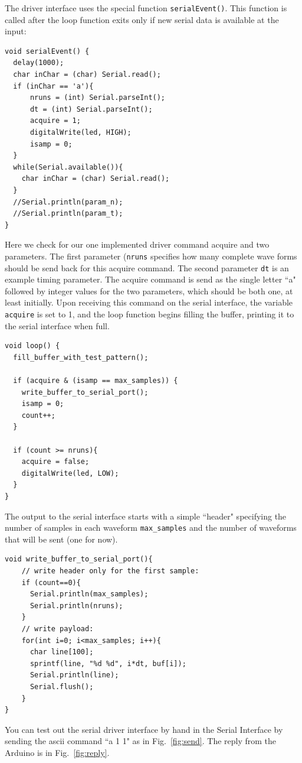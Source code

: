\documentclass[12pt]{article}
\begin{document}
The driver interface uses the special function {\tt serialEvent()}.  This function is called after the loop function exits only if new serial data is available at the input:
\begin{verbatim}
void serialEvent() {
  delay(1000);
  char inChar = (char) Serial.read();
  if (inChar == 'a'){
      nruns = (int) Serial.parseInt();
      dt = (int) Serial.parseInt();        
      acquire = 1;
      digitalWrite(led, HIGH);
      isamp = 0;
  }
  while(Serial.available()){
    char inChar = (char) Serial.read();  
  }
  //Serial.println(param_n);
  //Serial.println(param_t);
}
\end{verbatim}
Here we check for our one implemented driver command acquire and two parameters.  The first parameter ({\tt nruns} specifies how many complete wave forms should be send back for this acquire command.  The second parameter {\tt dt} is an example timing parameter.   The acquire command is send as the single letter ``a" followed by integer values for the two parameters, which should be both one, at least initially.
Upon receiving this command on the serial interface, the variable {\tt acquire} is set to 1, and the loop function begins filling the buffer, printing it to the serial interface when full.
\begin{verbatim}
void loop() {    
  fill_buffer_with_test_pattern();
  
  if (acquire & (isamp == max_samples)) {
    write_buffer_to_serial_port();
    isamp = 0;    
    count++;
  }

  if (count >= nruns){
    acquire = false;
    digitalWrite(led, LOW);
  }
}
\end{verbatim}
The output to the serial interface starts with a simple ``header" specifying the number of samples in each waveform {\tt max\_samples} and the number of waveforms that will be sent (one for now). 
\begin{verbatim}
void write_buffer_to_serial_port(){
    // write header only for the first sample:
    if (count==0){
      Serial.println(max_samples);
      Serial.println(nruns);
    }
    // write payload:
    for(int i=0; i<max_samples; i++){
      char line[100];
      sprintf(line, "%d %d", i*dt, buf[i]);
      Serial.println(line);
      Serial.flush();
    }
}
\end{verbatim}


You can test out the serial driver interface by hand in the Serial Interface by sending the ascii command ``a 1 1" as in Fig.~\ref{fig:send}.  The reply from the Arduino is in  Fig.~\ref{fig:reply}.
\end{document}
